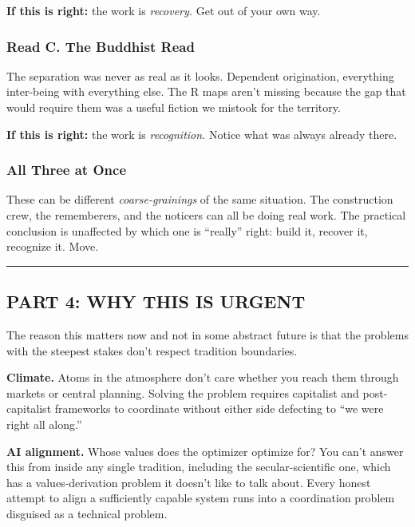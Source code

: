 \documentclass[
]{article}
\begin{document}
\textbf{If this is right:} the work is \emph{recovery.} Get out of your
own way.

\subsubsection{Read C. The Buddhist
Read}\label{read-c.-the-buddhist-read}

The separation was never as real as it looks. Dependent origination,
everything inter-being with everything else. The R maps aren't missing
because the gap that would require them was a useful fiction we mistook
for the territory.

\textbf{If this is right:} the work is \emph{recognition.} Notice what
was always already there.

\subsubsection{All Three at Once}\label{all-three-at-once}

These can be different \emph{coarse-grainings} of the same situation.
The construction crew, the rememberers, and the noticers can all be
doing real work. The practical conclusion is unaffected by which one is
``really'' right: build it, recover it, recognize it. Move.

\begin{center}\rule{0.5\linewidth}{0.5pt}\end{center}

\subsection{PART 4: WHY THIS IS URGENT}\label{part-4-why-this-is-urgent}

The reason this matters now and not in some abstract future is that the
problems with the steepest stakes don't respect tradition boundaries.

\textbf{Climate.} Atoms in the atmosphere don't care whether you reach
them through markets or central planning. Solving the problem requires
capitalist and post-capitalist frameworks to coordinate without either
side defecting to ``we were right all along.''

\textbf{AI alignment.} Whose values does the optimizer optimize for? You
can't answer this from inside any single tradition, including the
secular-scientific one, which has a values-derivation problem it doesn't
like to talk about. Every honest attempt to align a sufficiently capable
system runs into a coordination problem disguised as a technical
problem.
\end{document}
